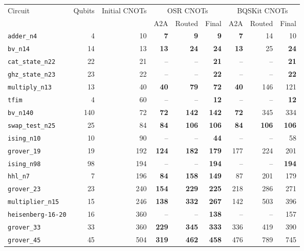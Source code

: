 \begin{table}[p]
\centering
\scriptsize
\begin{tabular}{lrr|rrr|rrr}
\hline
Circuit & Qubits & Initial CNOTs & \multicolumn{3}{c|}{OSR CNOTs} & \multicolumn{3}{c}{BQSKit CNOTs} \\
 & & & A2A & Routed & Final & A2A & Routed & Final \\
\hline
\texttt{adder\_n4} & 4 & 10 & \textbf{7} & \textbf{9} & \textbf{9} & \textbf{7} & 14 & 10 \\
\texttt{bv\_n14} & 14 & 13 & \textbf{13} & \textbf{24} & \textbf{24} & \textbf{13} & 25 & \textbf{24} \\
\texttt{cat\_state\_n22} & 22 & 21 & -- & -- & \textbf{21} & -- & -- & \textbf{21} \\
\texttt{ghz\_state\_n23} & 23 & 22 & -- & -- & \textbf{22} & -- & -- & \textbf{22} \\
\texttt{multiply\_n13} & 13 & 40 & \textbf{40} & \textbf{79} & \textbf{72} & \textbf{40} & 146 & 121 \\
\texttt{tfim} & 4 & 60 & -- & -- & \textbf{12} & -- & -- & \textbf{12} \\
\texttt{bv\_n140} & 140 & 72 & \textbf{72} & \textbf{142} & \textbf{142} & \textbf{72} & 345 & 334 \\
\texttt{swap\_test\_n25} & 25 & 84 & \textbf{84} & \textbf{106} & \textbf{106} & \textbf{84} & \textbf{106} & \textbf{106} \\
\texttt{ising\_n10} & 10 & 90 & -- & -- & \textbf{44} & -- & -- & 58 \\
\texttt{grover\_19} & 19 & 192 & \textbf{124} & \textbf{182} & \textbf{179} & 177 & 224 & 201 \\
\texttt{ising\_n98} & 98 & 194 & -- & -- & \textbf{194} & -- & -- & \textbf{194} \\
\texttt{hhl\_n7} & 7 & 196 & \textbf{84} & \textbf{158} & \textbf{149} & 87 & 201 & 179 \\
\texttt{grover\_23} & 23 & 240 & \textbf{154} & \textbf{229} & \textbf{225} & 218 & 286 & 271 \\
\texttt{multiplier\_n15} & 15 & 246 & \textbf{138} & \textbf{332} & \textbf{267} & 142 & 503 & 396 \\
\texttt{heisenberg-16-20} & 16 & 360 & -- & -- & \textbf{138} & -- & -- & 157 \\
\texttt{grover\_33} & 33 & 360 & \textbf{229} & \textbf{345} & \textbf{333} & 336 & 419 & 390 \\
\texttt{grover\_45} & 45 & 504 & \textbf{319} & \textbf{462} & \textbf{458} & 476 & 789 & 745 \\

\end{tabular}
\end{table}

